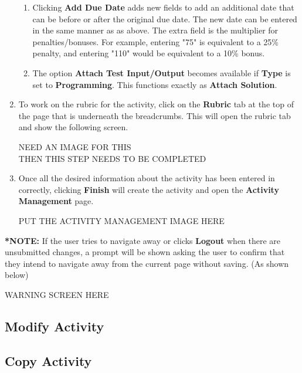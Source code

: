 \documentclass{article}
\begin{document}
\begin{enumerate}
\begin{center}
  \end{center}
  \begin{enumerate}
  \item Clicking \textbf{Add Due Date} adds new fields to add an additional date that can 
  be before or after the original due date. The new date can be entered in the same manner 
  as as above. The extra field is the multiplier for penalties/bonuses. For example, 
  entering "75" is equivalent to a 25\% penalty, and entering "110" would be equivalent 
  to a 10\% bonus.
  \item The option \textbf{Attach Test Input/Output} becomes available if \textbf{Type} 
  is set to \textbf{Programming}. This functions exactly as \textbf{Attach Solution}.
 \end{enumerate}
 \item To work on the rubric for the activity, click on the \textbf{Rubric} tab at the 
 top of the page that is underneath the breadcrumbs. This will open the rubric tab and 
 show the following screen.
 \begin{center} 
   NEED AN IMAGE FOR THIS
   \\ THEN THIS STEP NEEDS TO BE COMPLETED
 \end{center}
 \item Once all the desired information about the activity has been entered in correctly, 
 clicking \textbf{Finish} will create the activity and open the \textbf{Activity Management} 
 page.
  \begin{center} 
   PUT THE ACTIVITY MANAGEMENT IMAGE HERE
 \end{center}
\end{enumerate}
\textbf{*NOTE: }If the user tries to navigate away or clicks \textbf{Logout} when 
there are unsubmitted changes, a prompt will be shown asking the user to confirm that 
they intend to navigate away from the current page without saving. (As shown below)
 \begin{center} 
   WARNING SCREEN HERE
 \end{center}


\subsection{Modify Activity}

\subsection{Copy Activity}
\end{document}
